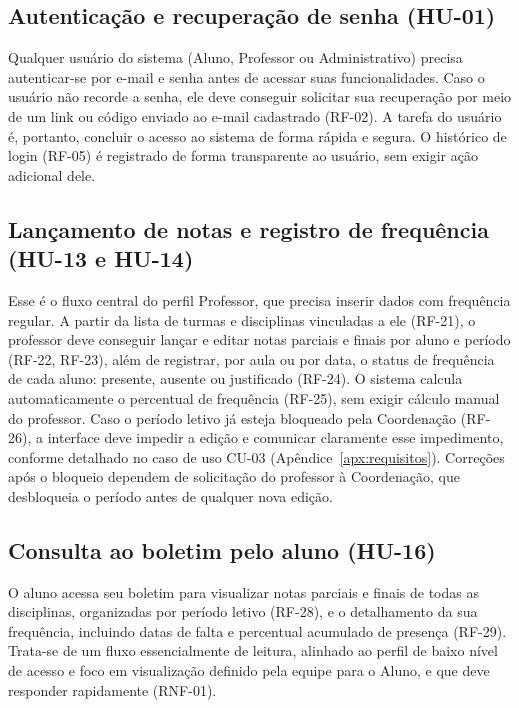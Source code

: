 \subsection{Autenticação e recuperação de senha (HU-01)}

Qualquer usuário do sistema (Aluno, Professor ou Administrativo) precisa
autenticar-se por e-mail e senha antes de acessar suas funcionalidades. Caso
o usuário não recorde a senha, ele deve conseguir solicitar sua recuperação
por meio de um link ou código enviado ao e-mail cadastrado (RF-02). A tarefa
do usuário é, portanto, concluir o acesso ao sistema de forma rápida e
segura. O histórico de login (RF-05) é registrado de forma transparente ao
usuário, sem exigir ação adicional dele.

\subsection{Lançamento de notas e registro de frequência (HU-13 e HU-14)}

Esse é o fluxo central do perfil Professor, que precisa inserir dados com
frequência regular. A partir da lista de turmas e disciplinas vinculadas a
ele (RF-21), o professor deve conseguir lançar e editar notas parciais e
finais por aluno e período (RF-22, RF-23), além de registrar, por aula ou
por data, o status de frequência de cada aluno: presente, ausente ou
justificado (RF-24). O sistema calcula automaticamente o percentual de
frequência (RF-25), sem exigir cálculo manual do professor. Caso o período
letivo já esteja bloqueado pela Coordenação (RF-26), a interface deve
impedir a edição e comunicar claramente esse impedimento, conforme
detalhado no caso de uso CU-03 (Apêndice~\ref{apx:requisitos}). Correções
após o bloqueio dependem de solicitação do professor à Coordenação, que
desbloqueia o período antes de qualquer nova edição.

\subsection{Consulta ao boletim pelo aluno (HU-16)}

O aluno acessa seu boletim para visualizar notas parciais e finais de todas
as disciplinas, organizadas por período letivo (RF-28), e o detalhamento da
sua frequência, incluindo datas de falta e percentual acumulado de presença
(RF-29). Trata-se de um fluxo essencialmente de leitura, alinhado ao perfil
de baixo nível de acesso e foco em visualização definido pela equipe para o
Aluno, e que deve responder rapidamente (RNF-01).

